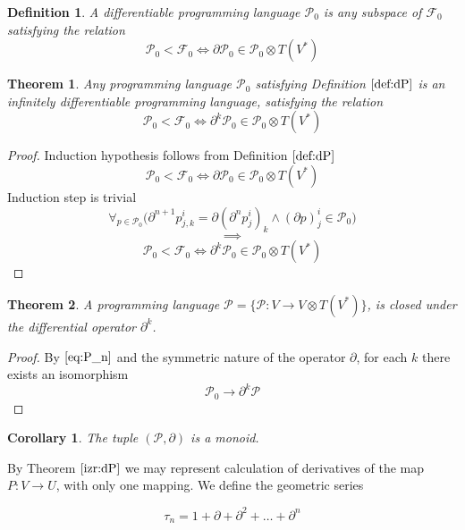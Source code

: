 \documentclass{article}
\newcommand{\F}{\mathcal{F}}
\newcommand{\dP}{\mathcal{P}}
\newcommand{\D}{\partial}
\newcommand{\sumd}{\tau}
\newtheorem{definicija}{Definition}[section]
\newtheorem{izrek}{Theorem}[section]
\newtheorem{corollary}{Corollary}[section]
\begin{document}
 \begin{definicija}\label{def:dP}
 	A differentiable programming language $\dP_0$ is any subspace of $\F_0$ satisfying the relation
 	\begin{equation}\label{eq:P}
 	\dP_0<\F_0\iff\D\dP_0\in\dP_0\otimes T(V^*)
 	\end{equation}
 \end{definicija}

\begin{izrek}\label{izr:P}
	Any programming language $\dP_0$ satisfying Definition $\ref{def:dP}$ is an infinitely differentiable programming language, satisfying the relation
	\begin{equation}\label{eq:P_n}
	 		\dP_0<\F_0\iff\D^k\dP_0\in\dP_0\otimes T(V^*)
	 	\end{equation}
\end{izrek}
\begin{proof} Induction hypothesis follows from Definition $\ref{def:dP}$
	$$\dP_0<\F_0\iff\D\dP_0\in\dP_0\otimes T(V^*)$$
	Induction step is trivial
	\begin{equation}\label{eq:inductionStep}
	\forall_{p\in\dP_0}\Big(\D^{n+1}p^i_{j,k}=\D(\D^n p^i_j)_k\land(\D p)^i_j\in\dP_0\Big)
	\end{equation}
	$$\implies$$
	$$\dP_0<\F_0\iff\D^k\dP_0\in\dP_0\otimes T(V^*)$$
\end{proof}

 \begin{izrek}\label{izr:dP}
	A programming language $\dP=\{\dP:V\to V\otimes T(V^*)\}$, is closed under the differential operator $\D^k$.
 \end{izrek}
 
 \begin{proof}
 	 By $\eqref{eq:P_n}$ and the symmetric nature of the operator $\D$, for each $k$ there exists an isomorphism
 	 	\begin{equation}
 	 		\dP_0\to\D^k\dP
 	 	\end{equation}
 \end{proof}

\begin{corollary}\label{cor:dpMonoid}
The tuple $(\dP,\D)$ is a monoid.
\end{corollary}

By Theorem $\ref{izr:dP}$ we may represent calculation of derivatives of the map $P:V\to U$, with only one mapping. We define the geometric series
 
 \begin{equation}\label{eq:DD}
  	\sumd_n = 1+\D +\D^2 +\ldots + \D^n 
  \end{equation}
  
\end{document}
